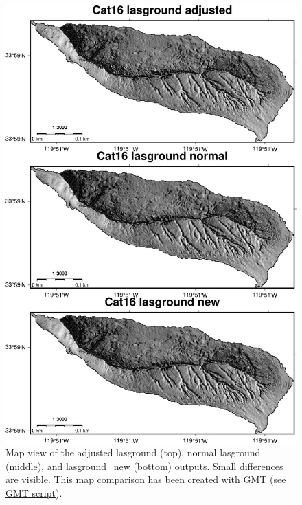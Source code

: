 \documentclass[a4paperpaper,,tablecaptionabove]{scrartcl}
\begin{document}
\begin{figure}
\centering
\includegraphics[width=\textwidth,height=0.9\textheight]{./tex2pdf.-e6884bf2dada0f3b/e1ed19ada7b4115e0fb8f02db69692fdf655382e.png}
\caption{Map view of the adjusted lasground (top), normal lasground
(middle), and lasground\_new (bottom) outputs. Small differences are
visible. This map comparison has been created with GMT (see
\href{https://github.com/BodoBookhagen/PC_geomorph_roughness/blob/master/example_01/example01_create_DEM_comparison_ground_classification_gmt.sh}{GMT
script}).\label{Fig:Cat16_lasground_comparison}}
\end{figure}
\end{document}

